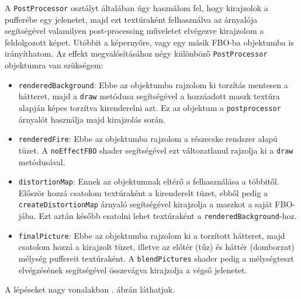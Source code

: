 A \texttt{PostProcessor} osztályt általában úgy használom fel, hogy kirajzolok a pufferébe egy jelenetet, majd ezt textúraként felhasználva az árnyalója segítségével valamilyen post-processing műveletet elvégezve kirajzolom a feldolgozott képet. Utóbbit a képernyőre, vagy egy másik FBO-ba objektumba is irányíthatom. Az effekt megvalósításához négy különböző \texttt{PostProcessor} objektumra van szükségem:
\begin{itemize}
\item  \texttt{renderedBackground}: Ebbe az objektumba rajzolom ki torzítás mentesen a hátteret, majd a \texttt{draw} metódusa segítségével a hozzáadott maszk textúra alapján képes torzítva kirenderelni azt. Ez az objektum a \texttt{postprocessor} árnyalót használja majd kirajzolás során.
\item \texttt{renderedFire}: Ebbe az objektumba rajzolom a részecske rendszer alapú tüzet. A \texttt{noEffectFBO} shader segítségével ezt változatlanul rajzolja ki a \texttt{draw} metódusával.
\item \texttt{distortionMap}: Ennek az objektumnak eltérő a felhasználása a többitől. Először hozzá csatolom textúraként a kirenderelt tüzet, ebből pedig a \texttt{createDistortionMap} árnyaló segítségével kirajzolja a maszkot a saját FBO-jába. Ezt aztán később csatolni lehet textúraként a \texttt{renderedBackground}-hoz.
\item \texttt{finalPicture}: Ebbe az objektumba rajzolom ki a torzított hátteret, majd csatolom hozzá a kirajzolt tüzet, illetve az előtér (tűz) és háttér (domborzat) mélység puffereit textúraként. A \texttt{blendPictures} shader pedig a mélységteszt elvégzésének segítségével összevágva kirajzolja a végső jelenetet.
\end{itemize}
A lépéseket nagy vonalakban . ábrán láthatjuk.
